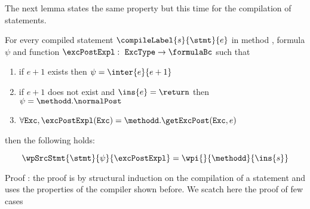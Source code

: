 The next lemma states the same property but this time for the compilation of statements.
\begin{thm}\label{relWpStmt}
     For every compiled statement $\compileLabel{s}{\stmt}{e}$  in  method \methodd, formula $\psi$ and 
    function $\excPostExpl : \mbox{ \rm \texttt{ExcType}}  \rightarrow \formulaBc $ such that 

      \begin{enumerate}
            \item if $e+1$ exists  then $\psi = \inter{e}{e+1}$
	    \item if $e+1$ does not exist and $\ins{e} = \return$ then $\psi = \methodd. \normalPost$
	    \item $\forall \mbox{\rm\texttt{Exc}} ,  \excPostExpl( \mbox{\rm\texttt{Exc}} ) = \methodd.\getExcPost(\mbox{\rm\texttt{Exc}}, e ) $ 
      \end{enumerate} then the following holds: 
  
     $$   \wpSrcStmt{\stmt}{\psi }{\excPostExpl} = \wpi{}{\methodd}{\ins{s}}$$   
\end{thm}

Proof : the proof is  by structural induction on the compilation of a statement and uses the properties of the compiler 
        shown before. We scatch here the proof of few cases 


